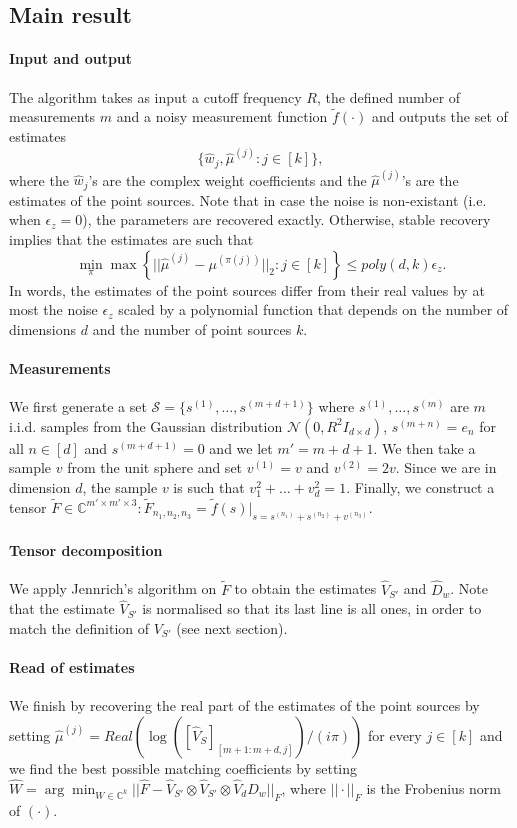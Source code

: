 \subsection{Main result}
\paragraph{Input and output} The algorithm takes as input a cutoff frequency $R$, the defined number of measurements $m$ and a noisy measurement function $\tilde{f}(\cdot)$ and outputs the set of estimates $$\{\widehat{w}_j,\widehat{\mu}^{(j)}:j\in[k]\},$$ where the $\widehat{w}_j$'s are the complex weight coefficients and the $\widehat{\mu}^{(j)}$'s are the estimates of the point sources. Note that in case the noise is non-existant (i.e. when $\epsilon_z=0$), the parameters are recovered exactly. Otherwise, stable recovery implies that the estimates are such that $$\min_\pi\max\left\{||\widehat{\mu}^{(j)}-\mu^{(\pi(j))}||_2:j\in[k]\right\}\leq poly(d,k)\epsilon_z.$$ In words, the estimates of the point sources differ from their real values by at most the noise $\epsilon_z$ scaled by a polynomial function that depends on the number of dimensions $d$ and the number of point sources $k$.
\paragraph{Measurements} We first generate a set $\mathcal{S}=\{s^{(1)},\ldots,s^{(m+d+1)}\}$ where $s^{(1)},\ldots,s^{(m)}$ are $m$ i.i.d. samples from the Gaussian distribution $\mathcal{N}(0,R^2I_{d\times d})$, $s^{(m+n)}=e_n$ for all $n\in[d]$ and $s^{(m+d+1)}=0$ and we let $m'=m+d+1$. We then take a sample $v$ from the unit sphere and set $v^{(1)}=v$ and $v^{(2)}=2v$. Since we are in dimension $d$, the sample $v$ is such that $v_1^2+\ldots+v_d^2=1$. Finally, we construct a tensor $\tilde{F}\in\mathbb{C}^{m'\times m'\times 3}:\tilde{F}_{n_1,n_2,n_3}=\tilde{f}(s)|_{s=s^{(n_1)}+s^{(n_2)}+v^{(n_3)}}$.
\paragraph{Tensor decomposition} We apply Jennrich's algorithm on $\tilde{F}$ to obtain the estimates $\widehat{V}_{S'}$ and $\widehat{D}_w$. Note that the estimate $\widehat{V}_{S'}$ is normalised so that its last line is all ones, in order to match the definition of $V_{S'}$ (see next section).
\paragraph{Read of estimates} We finish by recovering the real part of the estimates of the point sources by setting $\widehat{\mu}^{(j)}=Real(\log([\widehat{V}_S]_{[m+1:m+d,j]})/(i\pi))$ for every $j\in[k]$ and we find the best possible matching coefficients by setting $\widehat{W}=\arg\min_{W\in\mathbb{C}^k}||\widehat{F}-\widehat{V}_{S'}\otimes\widehat{V}_{S'}\otimes \widehat{V}_dD_w||_F$, where $||\cdot||_F$ is the Frobenius norm of $(\cdot)$.


